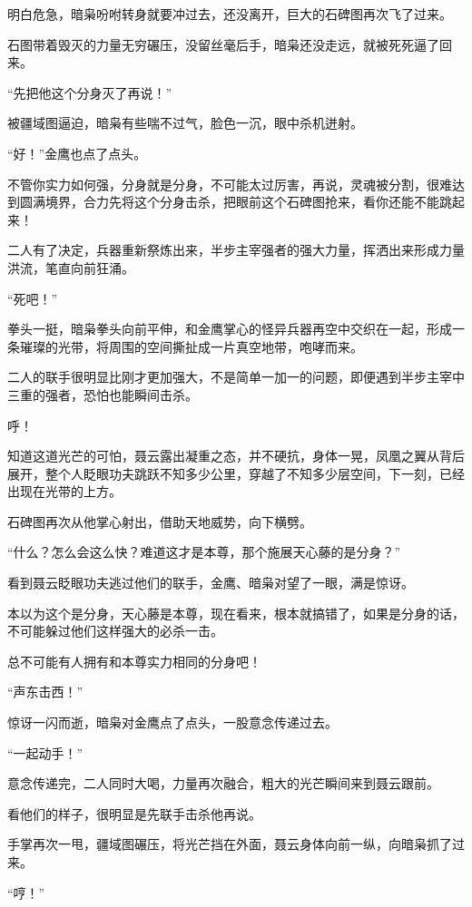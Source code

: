 \begin{this_body}
明白危急，暗枭吩咐转身就要冲过去，还没离开，巨大的石碑图再次飞了过来。

石图带着毁灭的力量无穷碾压，没留丝毫后手，暗枭还没走远，就被死死逼了回来。

“先把他这个分身灭了再说！”

被疆域图逼迫，暗枭有些喘不过气，脸色一沉，眼中杀机迸射。

“好！”金鹰也点了点头。

不管你实力如何强，分身就是分身，不可能太过厉害，再说，灵魂被分割，很难达到圆满境界，合力先将这个分身击杀，把眼前这个石碑图抢来，看你还能不能跳起来！

二人有了决定，兵器重新祭炼出来，半步主宰强者的强大力量，挥洒出来形成力量洪流，笔直向前狂涌。

“死吧！”

拳头一挺，暗枭拳头向前平伸，和金鹰掌心的怪异兵器再空中交织在一起，形成一条璀璨的光带，将周围的空间撕扯成一片真空地带，咆哮而来。

二人的联手很明显比刚才更加强大，不是简单一加一的问题，即便遇到半步主宰中三重的强者，恐怕也能瞬间击杀。

呼！

知道这道光芒的可怕，聂云露出凝重之态，并不硬抗，身体一晃，凤凰之翼从背后展开，整个人眨眼功夫跳跃不知多少公里，穿越了不知多少层空间，下一刻，已经出现在光带的上方。

石碑图再次从他掌心射出，借助天地威势，向下横劈。

“什么？怎么会这么快？难道这才是本尊，那个施展天心藤的是分身？”

看到聂云眨眼功夫逃过他们的联手，金鹰、暗枭对望了一眼，满是惊讶。

本以为这个是分身，天心藤是本尊，现在看来，根本就搞错了，如果是分身的话，不可能躲过他们这样强大的必杀一击。

总不可能有人拥有和本尊实力相同的分身吧！

“声东击西！”

惊讶一闪而逝，暗枭对金鹰点了点头，一股意念传递过去。

“一起动手！”

意念传递完，二人同时大喝，力量再次融合，粗大的光芒瞬间来到聂云跟前。

看他们的样子，很明显是先联手击杀他再说。

手掌再次一甩，疆域图碾压，将光芒挡在外面，聂云身体向前一纵，向暗枭抓了过来。

“哼！”


\end{this_body}
